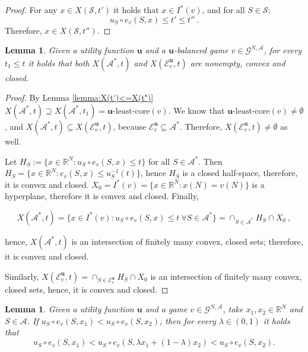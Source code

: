 \documentclass[a4paper,12pt]{article}
\newtheorem{lemma}[theorem]{Lemma}
\theoremstyle{definition}
\theoremstyle{remark}
\begin{document}
\begin{proof}
For any $x\in X(\mathcal{S}, t')$ it holds that $x\in I^*(v)$, and for all $S\in \mathcal{S}$:
\begin{equation*}
u_S\circ e_v(S, x) \leq t' \leq t'' \ .
\end{equation*}
Therefore, $x\in X(\mathcal{S}, t'')$.
\end{proof}

\begin{lemma}\label{lemma:convex}
Given a utility function $\mathbf{u}$ and a $\mathbf{u}$-balanced game $v\in \mathcal{G}^{N, \mathcal{A}}$, for every $t_1\leq t$ it holds that both $X(\mathcal{A}^\ast, t)$ and $X(\mathcal{E}_v^{\mathbf{u}}, t)$ are nonempty, convex and closed.
\end{lemma}

\begin{proof}
By Lemma \ref{lemma:X(t')<=X(t")} $X(\mathcal{A}^\ast, t) \supseteq X(\mathcal{A}^\ast, t_1) = \mathbf{u}\text{-least-core}(v)$. We know that $\mathbf{u}\text{-least-core}(v) \neq \emptyset$, and $X(\mathcal{A}^\ast, t) \subseteq X(\mathcal{E}_v^{\mathbf{u}}, t)$, because $\mathcal{E}_v^{\mathbf{u}} \subseteq \mathcal{A}^*$. Therefore, $X(\mathcal{E}_v^\mathbf{u}, t) \neq \emptyset$ as well.

Let $H_S := \{ x\in \mathbb{R}^N \colon u_S \circ e_v (S,x) \leq t \}$ for all $S\in\mathcal{A}^\ast$. Then $H_S = \{ x \in \mathbb{R}^N \colon e_v (S,x) \leq u_S^{-1}(t) \}$, hence $H_S$ is a closed half-space, therefore, it is convex and closed. $X_0 = I^*(v) = \{x\in \mathbb{R}^N \colon x(N) = v(N) \}$ is a hyperplane, therefore it is convex and closed. Finally,

\begin{equation*}
X(\mathcal{A}^*, t) = \{x\in I^*(v) \colon u_S \circ e_v (S,x) \leq t \ \forall S\in \mathcal{A}^* \} = \cap_{S\in \mathcal{A}^*}H_S\cap X_0 \ ,
\end{equation*}

\noindent hence, $X(\mathcal{A}^*, t)$ is an intersection of finitely many convex, closed sets; therefore, it is convex and closed.

Similarly, $X(\mathcal{E}_v^{\mathbf{u}}, t) = \cap_{S\in \mathcal{E}^{\mathbf{u}}_v}H_S\cap X_0$ is an intersection of finitely many convex, closed sets, hence, it is convex and closed.
\end{proof}

\begin{lemma}\label{lemma:monotone}
Given a utility function $\mathbf{u}$ and a game $v\in \mathcal{G}^{N, \mathcal{A}}$, take $x_1, x_2 \in \mathbb{R}^N$ and $S\in \mathcal{A}$. If $u_S\circ e_v(S, x_1) < u_S\circ e_v(S, x_2)$,  then for every $\lambda \in (0, 1)$ it holds that 
\begin{equation*}
u_S\circ e_v(S, x_1) < u_S\circ e_v(S, \lambda x_1 + (1-\lambda) x_2) < u_S\circ e_v(S, x_2).
\end{equation*}
\end{lemma}
\end{document}
